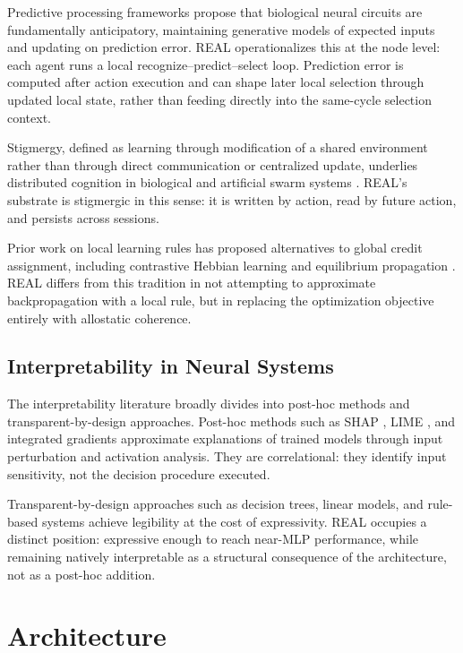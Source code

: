 \documentclass[letterpaper]{article}
\begin{document}
Predictive processing frameworks \citep{rao1999predictive} propose that biological
neural circuits are fundamentally anticipatory, maintaining generative models of
expected inputs and updating on prediction error. REAL operationalizes this at the
node level: each agent runs a local recognize--predict--select loop. Prediction
error is computed after action execution and can shape later local selection
through updated local state, rather than feeding directly into the same-cycle
selection context.

Stigmergy, defined as learning through modification of a shared environment rather
than through direct communication or centralized update, underlies distributed
cognition in biological and artificial swarm systems
\citep{theraulaz1999stigmergy}. REAL's substrate is stigmergic in this sense: it
is written by action, read by future action, and persists across sessions.

Prior work on local learning rules has proposed alternatives to global credit
assignment, including contrastive Hebbian learning \citep{movellan1991contrastive}
and equilibrium propagation \citep{scellier2017equilibrium}. REAL differs from
this tradition in not attempting to approximate backpropagation with a local rule,
but in replacing the optimization objective entirely with allostatic coherence.

\subsection{Interpretability in Neural Systems}

The interpretability literature broadly divides into post-hoc methods and
transparent-by-design approaches. Post-hoc methods such as SHAP
\citep{lundberg2017shap}, LIME \citep{ribeiro2016lime}, and integrated gradients
\citep{sundararajan2017integrated} approximate explanations of trained models
through input perturbation and activation analysis. They are correlational: they
identify input sensitivity, not the decision procedure executed.

Transparent-by-design approaches such as decision trees, linear models, and
rule-based systems achieve legibility at the cost of expressivity. REAL occupies a
distinct position: expressive enough to reach near-MLP performance, while
remaining natively interpretable as a structural consequence of the architecture,
not as a post-hoc addition.

\section{Architecture}
\end{document}
